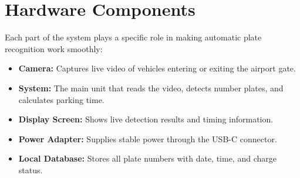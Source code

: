 \section{Hardware Components}

Each part of the system plays a specific role in making automatic plate recognition work smoothly:

\begin{itemize}
	\item \textbf{Camera:} Captures live video of vehicles entering or exiting the airport gate.
	\item \textbf{System:} The main unit that reads the video, detects number plates, and calculates parking time.
	\item \textbf{Display Screen:} Shows live detection results and timing information.
	\item \textbf{Power Adapter:} Supplies stable  power through the USB-C connector.
	\item \textbf{Local Database:} Stores all plate numbers with date, time, and charge status.
\end{itemize}





%
%
%
